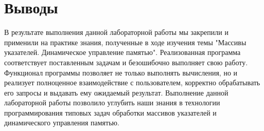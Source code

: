 \section*{Выводы}

В результате выполнения данной лабораторной работы мы закрепили и применили на практике знания,
полученные в ходе изучения темы
"Массивы указателей.
Динамическое управление памятью".
Реализованная программа соответствует поставленным задачам и безошибочно выполняет свою работу.
Функционал программы позволяет не только выполнять вычисления, но и реализует полноценное взаимодействие
с пользователем, корректно обрабатывать его запросы и выдавать ему
ожидаемый результат.
Выполнение данной лабораторной работы позволило углубить наши знания в технологии программирования типовых
задач обработки массивов указателей и динамического управления памятью.